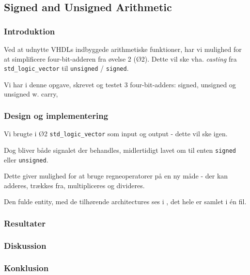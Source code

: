 \subsection{Signed and Unsigned Arithmetic}

\subsubsection{Introduktion}

Ved at udnytte VHDLs indbyggede arithmetiske funktioner, har vi mulighed for at simplificere four-bit-adderen fra øvelse 2 (Ø2).
Dette vil ske vha.  \textit{casting} fra \texttt{std\_logic\_vector} til \texttt{unsigned} / \texttt{signed}. 

Vi har i denne opgave, skrevet og testet 3 four-bit-adders: signed, unsigned og unsigned w. carry, 

\subsubsection{Design og implementering}

Vi brugte i Ø2 \texttt{std\_logic\_vector} som input og output - dette vil ske igen. 

Dog bliver både signalet der behandles, midlertidigt lavet om til enten \texttt{signed} eller \texttt{unsigned}.

Dette giver mulighed for at bruge regneoperatorer på en ny måde - der kan adderes, trækkes fra, multipliceres og divideres.

Den fulde entity, med de tilhørende architectures ses i , det hele er samlet i én fil.




\subsubsection{Resultater}

\subsubsection{Diskussion}

\subsubsection{Konklusion}